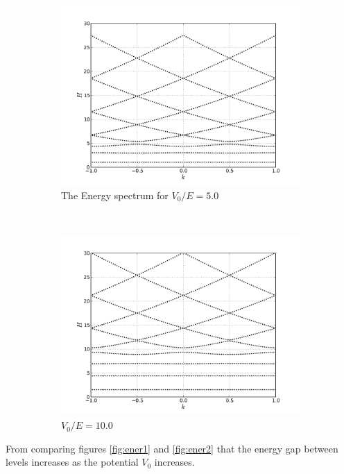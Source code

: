 \documentclass[11pt,a4paper]{article}
\begin{document}
\begin{figure}[hb!]
        \centering
        \begin{subfigure}[h!]{0.5\textwidth}
                \includegraphics[width=\textwidth]{ener_spectrum/spectr_05tv01.pdf}
                \caption{The Energy spectrum for $V_0/E = 5.0$}
                \label{fig:3a}
        \end{subfigure}%
        ~ %
        \begin{subfigure}[hb!]{0.5\textwidth}
                \includegraphics[width=\textwidth]{ener_spectrum/spectr_10tv01.pdf}
                \caption{$V_0/E = 10.0$}
                \label{fig:3b}
        \end{subfigure}
\caption{}\label{fig:ener3}
\end{figure}
From comparing figures \ref{fig:ener1} and \ref{fig:ener2} that the energy gap between levels increases as the potential $V_0$ increases.
\end{document}
